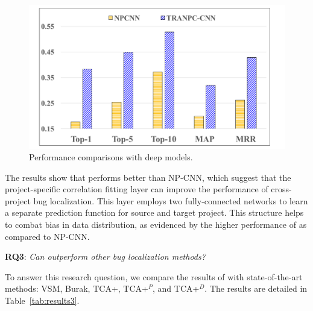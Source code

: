 \begin{figure}[hbt]
\centering
\includegraphics[width = 0.9\columnwidth]{pic/results2_avg.pdf}
\caption{Performance comparisons with deep models.}
\label{fig:results2}
\end{figure}

The results show that \TRANPCNN performs better than NP-CNN, which suggest that the project-specific correlation fitting layer can improve the performance of cross-project bug localization. This layer employs two fully-connected networks to learn a separate prediction function for source and target project. This structure helps to combat bias in data distribution, as evidenced by the higher performance of \TRANPCNN as compared to NP-CNN.  

\textbf{RQ3}: \textit{Can \TRANPCNN outperform other bug localization methods?}

To answer this research question, we compare the results of \TRANPCNN with state-of-the-art methods: VSM, Burak, TCA+, TCA+$^P$, and TCA+$^D$. %
The results are detailed in Table~\ref{tab:results3}. 


